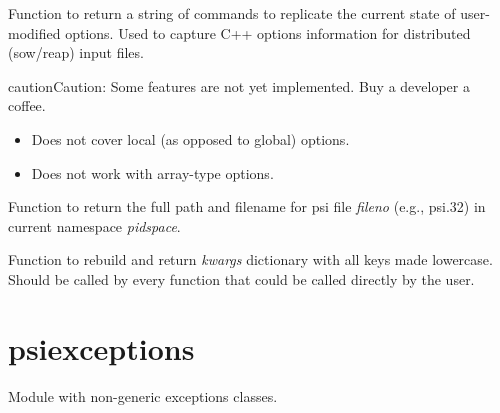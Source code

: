 \documentclass[letterpaper,10pt,english]{sphinxmanual}
\begin{document}
\begin{fulllineitems}
\label{index:procutil.format_options_for_input}
Function to return a string of commands to replicate the
current state of user-modified options. Used to capture C++
options information for distributed (sow/reap) input files.

\begin{notice}{caution}{Caution:}
Some features are not yet implemented. Buy a developer a coffee.
\begin{itemize}
\item {} 
Does not cover local (as opposed to global) options.

\item {} 
Does not work with array-type options.

\end{itemize}
\end{notice}

\end{fulllineitems}


\begin{fulllineitems}
\label{index:procutil.get_psifile}
Function to return the full path and filename for psi file
\emph{fileno} (e.g., psi.32) in current namespace \emph{pidspace}.

\end{fulllineitems}


\begin{fulllineitems}
\label{index:procutil.kwargs_lower}
Function to rebuild and return \emph{kwargs} dictionary
with all keys made lowercase. Should be called by every
function that could be called directly by the user.

\end{fulllineitems}



\section{psiexceptions}
\label{index:module-psiexceptions}\label{index:psiexceptions}
Module with non-generic exceptions classes.
\end{document}
